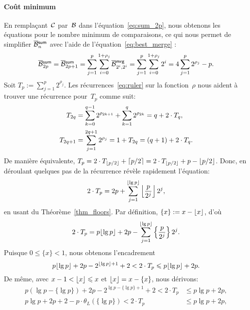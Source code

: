 \paragraph{Coût minimum}

En remplaçant~\(\mathcal{C}\) par~\(\mathcal{B}\) dans
l'équation~\eqref{eq:sum_2p}, nous obtenons les équations pour le
nombre minimum de comparaisons, ce qui nous permet de simplifier
\(\OB{\fun{sum}}{n}\) avec l'aide de
l'équation~\eqref{eq:best_merge} :
\begin{equation}
\OB{\fun{sum}}{2p}
  = \OB{\fun{sum}}{2p+1}
  = \sum_{j=1}^{p}\sum_{i=0}^{1+\rho_{j}}{\OB{\fun{mrg}}{2^i,2^i}}
  = \sum_{j=1}^{p}\sum_{i=0}^{1+\rho_{j}}{2^{i}}
  = 4\sum_{j=1}^{p}{2^{\rho_{j}}} - p.
\label{eq:B_oplus}
\end{equation}
Soit \(T_p := \sum_{j=1}^{p}{2^{\rho_{j}}}\). Les
récurrences~\eqref{eq:ruler}  sur la
fonction~\(\rho\) nous aident à trouver une récurrence pour~\(T_p\)
comme suit:
\begin{align*}
T_{2q} &= \sum_{k=0}^{\smash[t]{q-1}}{2^{\rho_{2k+1}}} +
\sum_{k=1}^{q}{2^{\rho_{2k}}} = q + 2 \cdot T_{q},\\[2mm]
T_{2q+1}
&= \sum_{j=1}^{\smash[t]{2q+1}}{2^{\rho_{j}}} = 1 + T_{2q} = (q + 1) +
2 \cdot T_{q}.
\end{align*}
De manière équivalente, \(T_{p} = 2 \cdot T_{\lfloor{p/2}\rfloor} +
\lceil{p/2}\rceil = 2 \cdot T_{\lfloor{p/2}\rfloor} + p - \lfloor{p/2}\rfloor\). Donc, en
déroulant quelques pas de la récurrence révèle rapidement l'équation:
\begin{equation*}
2 \cdot T_p = 2p + \sum_{j=1}^{\lfloor{\lg p}\rfloor}
            {\left\lfloor{\frac{p}{2^j}}\right\rfloor 2^j},
\end{equation*}
en usant du Théorème~\vref{thm_floors}. Par définition, \(\{x\} := x -
\lfloor{x}\rfloor\), d'où
\begin{equation*}
2 \cdot T_p = p\lfloor{\lg p}\rfloor + 2p - \sum_{j=1}^{\lfloor{\lg
    p}\rfloor}\left\lbrace\frac{p}{2^j}\right\rbrace 2^j.
\end{equation*}
Puisque \(0 \leqslant \{x\} < 1\), nous obtenons l'encadrement
\begin{equation*}
p\lfloor{\lg p}\rfloor + 2p - 2^{\lfloor{\lg p}\rfloor+1} + 2 < 2 \cdot T_p \leqslant
p\lfloor{\lg p}\rfloor + 2p.
\end{equation*}
De même, avec \(x - 1 < \lfloor{x}\rfloor \leqslant x\) et \(\lfloor{x}\rfloor = x -
\{x\}\), nous dérivons:
\begin{align*}
p(\lg p - \{\lg p\}) + 2p - 2^{\lg p - \{\lg p\} +
  1} + 2 < 2 \cdot T_p &\leqslant p\lg p + 2p,\\
p\lg p + 2p + 2 - p \cdot \theta_L(\{\lg p\}) < 2 \cdot T_p
&\leqslant p\lg p + 2p,
\end{align*}
